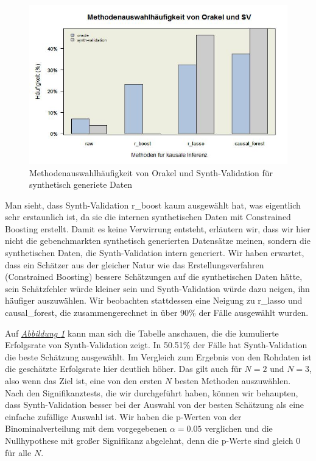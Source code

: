 \documentclass[12pt,a4paper,twoside]{scrartcl}
\numberwithin{equation}{section}
\newcommand{\reffig}[1]{\emph{\hyperref[#1]{Abbildung \ref*{#1}}}}
\begin{document}
\begin{center}
\begin{figure}[h]
    \centering
    \includegraphics[height=0.5\textwidth, width=1\textwidth]{figures/plots/generatedDataBarplot.jpeg}
    \caption[Methodenauswahlhäufigkeit von Orakel und Synth-Validation für synthetisch generiete Daten]{Methodenauswahlhäufigkeit von Orakel und Synth-Validation für synthetisch generiete Daten}\label{fig:generatedDataBarplot}
  \end{figure}
\end{center}

\noindent
Man sieht, dass Synth-Validation r\_boost kaum ausgewählt hat, was eigentlich sehr erstaunlich ist, da sie die internen synthetischen Daten mit Constrained Boosting erstellt. Damit es keine Verwirrung entsteht, erläutern wir, dass wir hier nicht die gebenchmarkten synthetisch generierten Datensätze meinen, sondern die synthetischen  Daten, die Synth-Validation intern generiert. Wir haben erwartet, dass ein Schätzer aus der gleicher Natur wie das Erstellungsverfahren (Constrained Boosting) bessere Schätzungen auf die synthetischen Daten hätte, sein Schätzfehler würde kleiner sein und Synth-Validation würde dazu neigen, ihn häufiger auszuwählen. Wir beobachten stattdessen eine Neigung zu r\_lasso und causal\_forest, die zusammengerechnet in über 90\% der Fälle ausgewählt wurden.\par

\noindent
Auf \reffig{fig:generatedDataBarplot} kann man sich die Tabelle anschauen, die die kumulierte Erfolgsrate von Synth-Validation zeigt. In 50.51\% der Fälle hat Synth-Validation die beste Schätzung ausgewählt. Im Vergleich zum Ergebnis von den Rohdaten ist die geschätzte Erfolgsrate hier deutlich höher. Das gilt auch für $N=2$ und $N=3$, also wenn das Ziel ist, eine von den ersten $N$ besten Methoden auszuwählen. Nach den Signifikanztests, die wir durchgeführt haben, können wir behaupten, dass Synth-Validation besser bei der Auswahl von der besten Schätzung als eine einfache zufällige Auswahl ist. Wir haben die p-Werten von der Binominalverteilung mit dem vorgegebenen $\alpha = 0.05$ verglichen und die Nullhypothese mit großer Signifikanz abgelehnt, denn die p-Werte sind gleich 0 für alle $N$.
\end{document}
